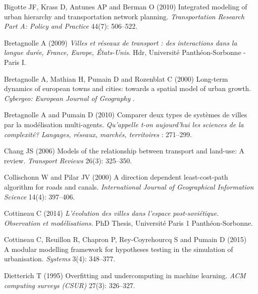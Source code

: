 \documentclass[Royal,sageh,times]{sagej}
\begin{document}
\begin{thebibliography}{51}
Bigotte JF, Krass D, Antunes AP and Berman O (2010) Integrated modeling of
  urban hierarchy and transportation network planning.
\newblock \emph{Transportation Research Part A: Policy and Practice} 44(7):
  506--522.

Bretagnolle A (2009) \emph{{Villes et r{\'e}seaux de transport : des
  interactions dans la longue dur{\'e}e, France, Europe, {\'E}tats-Unis}}.
\newblock Hdr, Universit{\'e} Panth{\'e}on-Sorbonne - Paris I.

Bretagnolle A, Mathian H, Pumain D and Rozenblat C (2000) Long-term dynamics of
  european towns and cities: towards a spatial model of urban growth.
\newblock \emph{Cybergeo: European Journal of Geography} .

Bretagnolle A and Pumain D (2010) Comparer deux types de syst{\`e}mes de villes
  par la mod{\'e}lisation multi-agents.
\newblock \emph{Qu'appelle t-on aujourd'hui les sciences de la complexit{\'e}?
  Langages, r{\'e}seaux, march{\'e}s, territoires} : 271--299.

Chang JS (2006) Models of the relationship between transport and land-use: A
  review.
\newblock \emph{Transport Reviews} 26(3): 325--350.

Collischonn W and Pilar JV (2000) A direction dependent least-cost-path
  algorithm for roads and canals.
\newblock \emph{International Journal of Geographical Information Science}
  14(4): 397--406.

Cottineau C (2014) \emph{L'{\'e}volution des villes dans l'espace
  post-sovi{\'e}tique. Observation et mod{\'e}lisations.}
\newblock PhD Thesis, Universit{\'e} Paris 1 Panth{\'e}on-Sorbonne.

Cottineau C, Reuillon R, Chapron P, Rey-Coyrehourcq S and Pumain D (2015) A
  modular modelling framework for hypotheses testing in the simulation of
  urbanisation.
\newblock \emph{Systems} 3(4): 348--377.

Dietterich T (1995) Overfitting and undercomputing in machine learning.
\newblock \emph{ACM computing surveys (CSUR)} 27(3): 326--327.


\end{thebibliography}
\end{document}
